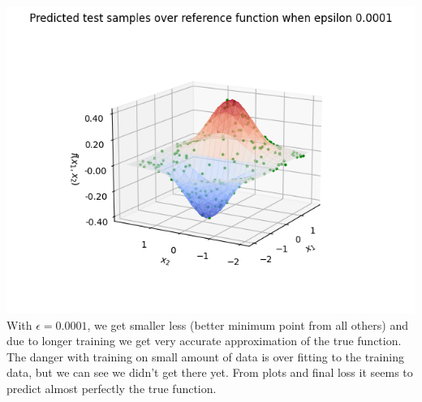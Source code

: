 \documentclass[12pt]{article}
\begin{document}
\includegraphics{model_test_over_ref_func_3.png}\\
With $\epsilon=0.0001$, we get smaller less (better minimum point from all others) and due to longer training we get very accurate approximation of the true function.\\
The danger with training on small amount of data is over fitting to the training data, but we can see we didn't get there yet. From plots and final loss it seems to predict almost perfectly the true function.
\end{document}
